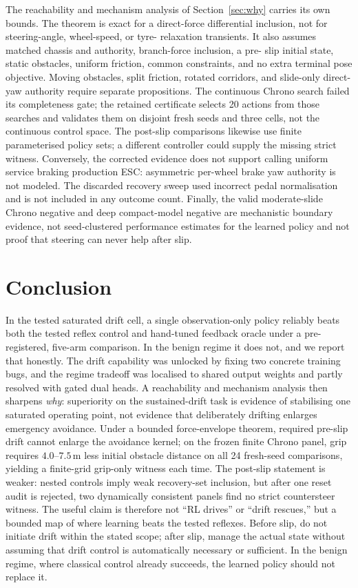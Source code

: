 \documentclass[11pt]{article}
\begin{document}
The reachability and mechanism analysis of Section~\ref{sec:why} carries its own bounds. The theorem
is exact for a direct-force differential inclusion, not for steering-angle, wheel-speed, or tyre-
relaxation transients. It also assumes matched chassis and authority, branch-force inclusion, a pre-
slip initial state, static obstacles, uniform friction, common constraints, and no extra terminal
pose objective. Moving obstacles, split friction, rotated corridors, and slide-only direct-yaw
authority require separate propositions. The continuous Chrono search failed its completeness gate;
the retained certificate selects 20 actions from those searches and validates them on disjoint fresh
seeds and three cells, not the continuous control space. The post-slip comparisons likewise use
finite parameterised policy sets; a different controller could supply the missing strict witness.
Conversely, the corrected evidence does not support calling uniform service braking production ESC:
asymmetric per-wheel brake yaw authority is not modeled. The discarded recovery sweep used incorrect
pedal normalisation and is not included in any outcome count. Finally, the valid moderate-slide
Chrono negative and deep compact-model negative are mechanistic boundary evidence, not seed-clustered
performance estimates for the learned policy and not proof that steering can never help after slip.

\section{Conclusion}
In the tested saturated drift cell, a single observation-only policy reliably beats both the tested
reflex control and hand-tuned feedback oracle under a pre-registered, five-arm comparison. In the
benign regime it does not, and we report that honestly. The drift capability was unlocked by fixing
two concrete training bugs, and the regime tradeoff was localised to shared output weights and
partly resolved with gated dual heads. A reachability and mechanism analysis then sharpens
\emph{why}: superiority on the sustained-drift task is evidence of stabilising one saturated
operating point, not evidence that deliberately drifting enlarges emergency avoidance. Under a
bounded force-envelope theorem, required pre-slip drift cannot enlarge the avoidance kernel; on the
frozen finite Chrono panel, grip requires $4.0$--$7.5$\,m less initial obstacle distance on all 24
fresh-seed comparisons, yielding a finite-grid grip-only witness each time. The post-slip statement
is weaker: nested controls imply weak recovery-set inclusion, but after one reset audit is rejected,
two dynamically consistent panels find no strict countersteer witness. The useful claim is therefore not
``RL drives'' or ``drift rescues,'' but a bounded map of where learning beats the tested reflexes.
Before slip, do not initiate drift within the stated scope; after slip, manage the actual state
without assuming that drift control is automatically necessary or sufficient. In the benign regime,
where classical control already succeeds, the learned policy should not replace it.
\end{document}
